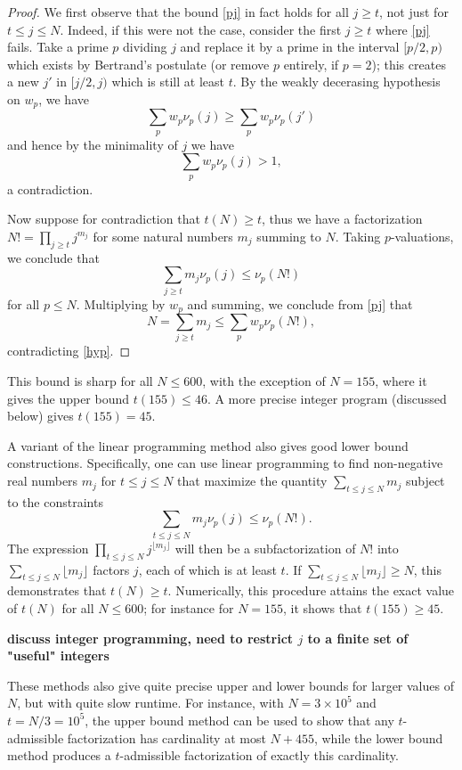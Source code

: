 \documentclass[12pt,a4paper,reqno]{amsart}
\numberwithin{equation}{section}
\theoremstyle{plain}
\theoremstyle{definition}
\begin{document}
  \begin{proof}
  We first observe that the bound \eqref{pj} in fact holds for all $j \geq t$, not just for $t \leq j \leq N$.  Indeed, if this were not the case, consider the first $j \geq t$ where \eqref{pj} fails.  Take a prime $p$ dividing $j$ and replace it by a prime in the interval $[p/2,p)$ which exists by Bertrand's postulate (or remove $p$ entirely, if $p=2$); this creates a new $j'$ in $[j/2,j)$ which is still at least $t$.  By the weakly decerasing hypothesis on $w_p$, we have
  $$ \sum_p w_p \nu_p(j) \geq \sum_p w_p \nu_p(j')$$
  and hence by the minimality of $j$ we have
  $$ \sum_p w_p \nu_p(j) > 1, $$
  a contradiction.
  
  Now suppose for contradiction that $t(N) \geq t$, thus we have a factorization $N! = \prod_{j \geq t} j^{m_j}$ for some natural numbers $m_j$ summing to $N$.  Taking $p$-valuations, we conclude that
  $$ \sum_{j \geq t} m_j \nu_p(j) \leq \nu_p(N!)$$
  for all $p \leq N$.  Multiplying by $w_p$ and summing, we conclude from \eqref{pj} that
  $$ N = \sum_{j \geq t} m_j \leq \sum_p w_p \nu_p(N!),$$
  contradicting \eqref{hyp}.
  \end{proof}
  
  This bound is sharp for all $N \leq 600$, with the exception of $N=155$, where it gives the upper bound $t(155) \leq 46$.  A more precise integer program (discussed below) gives $t(155) = 45$.

  
A variant of the linear programming method also gives good lower bound constructions. Specifically, one can use linear programming to find non-negative real numbers $m_j$ for $t \leq j \leq N$ that maximize the quantity $\sum_{t \leq j \leq N} m_j$ subject to the constraints
    $$ \sum_{t \leq j \leq N} m_j \nu_p(j) \leq \nu_p(N!).$$
  The expression $\prod_{t \leq j \leq N} j^{\lfloor m_j\rfloor}$ will then be a subfactorization of $N!$ into $\sum_{t \leq j \leq N} \lfloor m_j \rfloor$ factors $j$, each of which is at least $t$. If $\sum_{t \leq j \leq N} \lfloor m_j \rfloor \geq N$, this demonstrates that $t(N) \geq t$.  Numerically, this procedure attains the exact value of $t(N)$ for all $N \leq 600$; for instance for $N=155$, it shows that $t(155) \geq 45$.

{\bf discuss integer programming, need to restrict $j$ to a finite set of "useful" integers}

These methods also give quite precise upper and lower bounds for larger values of $N$, but with quite slow runtime. For instance, with $N = 3 \times 10^5$ and $t = N/3 = 10^5$, the upper bound method can be used to show that any $t$-admissible factorization has cardinality at most $N+455$, while the lower bound method produces a $t$-admissible factorization of exactly this cardinality.
\end{document}
